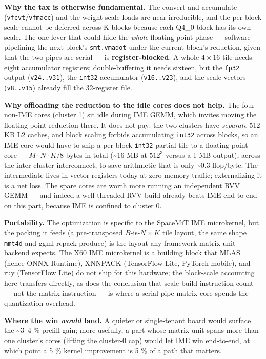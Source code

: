 \documentclass[
]{article}
\begin{document}
\textbf{Why the tax is otherwise fundamental.} The convert and
accumulate (\texttt{vfcvt}/\texttt{vfmacc}) and the weight-scale loads
are near-irreducible, and the per-block scale cannot be deferred across
K-blocks because each Q4\_0 block has its own scale. The one lever that
could hide the \emph{whole} floating-point phase --- software-pipelining
the next block's \texttt{smt.vmadot} under the current block's
reduction, given that the two pipes are serial --- is
\textbf{register-blocked}. A whole \(4\times16\) tile needs eight
accumulator registers; double-buffering it needs sixteen, but the
\texttt{fp32} output (\texttt{v24..v31}), the \texttt{int32} accumulator
(\texttt{v16..v23}), and the scale vectors (\texttt{v8..v15}) already
fill the 32-register file.

\textbf{Why offloading the reduction to the idle cores does not help.}
The four non-IME cores (cluster 1) sit idle during IME GEMM, which
invites moving the floating-point reduction there. It does not pay: the
two clusters have \emph{separate} 512 KB L2 caches, and block scaling
forbids accumulating \texttt{int32} across blocks, so an IME core would
have to ship a per-block \texttt{int32} partial tile to a floating-point
core --- \(M\cdot N\cdot K/8\) bytes in total (\textasciitilde16 MB at
\(512^3\) versus a 1 MB output), across the inter-cluster interconnect,
to save arithmetic that is only \textasciitilde0.3 flop/byte. The
intermediate lives in vector registers today at zero memory traffic;
externalizing it is a net loss. The spare cores are worth more running
an independent RVV GEMM --- and indeed a well-threaded RVV build already
beats IME end-to-end on this part, because IME is confined to cluster 0.

\textbf{Portability.} The optimization is specific to the SpaceMiT IME
microkernel, but the packing it feeds (a pre-transposed
\(B\)-is-\(N\times K\) tile layout, the same shape \texttt{mmt4d} and
ggml-repack produce) is the layout any framework matrix-unit backend
expects. The X60 IME microkernel is a building block that MLAS (hence
ONNX Runtime), XNNPACK (TensorFlow Lite, PyTorch mobile), and ruy
(TensorFlow Lite) do not ship for this hardware; the block-scale
accounting here transfers directly, as does the conclusion that
scale-build instruction count --- not the matrix instruction --- is
where a serial-pipe matrix core spends the quantization overhead.

\textbf{Where the win \emph{would} land.} A quieter or single-tenant
board would surface the \textasciitilde3--4 \% prefill gain; more
usefully, a part whose matrix unit spans more than one cluster's cores
(lifting the cluster-0 cap) would let IME win end-to-end, at which point
a 5 \% kernel improvement is 5 \% of a path that matters.
\end{document}

